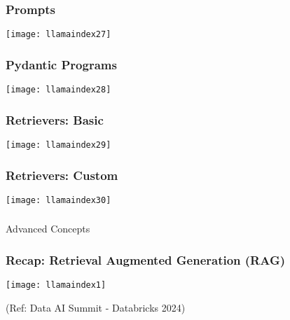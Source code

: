\begin{frame}[fragile]\frametitle{Prompts}

\begin{center}
\texttt{[image: llamaindex27]}
\end{center}
\end{frame}

\begin{frame}[fragile]\frametitle{Pydantic Programs}

\begin{center}
\texttt{[image: llamaindex28]}
\end{center}
\end{frame}

\begin{frame}[fragile]\frametitle{Retrievers: Basic}

\begin{center}
\texttt{[image: llamaindex29]}
\end{center}
\end{frame}


\begin{frame}[fragile]\frametitle{Retrievers: Custom}

\begin{center}
\texttt{[image: llamaindex30]}
\end{center}
\end{frame}

\begin{frame}[fragile]\frametitle{}
\begin{center}
{\Large Advanced Concepts}
\end{center}
\end{frame}

\begin{frame}[fragile]\frametitle{Recap: Retrieval Augmented Generation (RAG)}

\begin{center}
\texttt{[image: llamaindex1]}

{\tiny (Ref: Data AI Summit - Databricks 2024)}
\end{center}
\end{frame}

